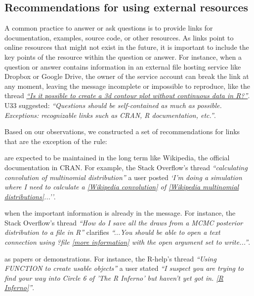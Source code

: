 \subsection{Recommendations for using external resources}

    A common practice to answer or ask questions is to provide links for documentation, examples, source code, or other resources.
    As links point to online resources that might not exist in the future, it is important to include the key points of the resource within the question or answer.
    For instance, when a question or answer contains information in an external file hosting service like Dropbox or Google Drive, the owner of the service account can break the link at any moment, leaving the message incomplete or impossible to reproduce, like the thread \textit{\href{http://goo.gl/5nanFU}{``Is it possible to create a 3d contour plot without continuous data in R?''}}.
    U33 suggested: \textit{``Questions should be self-contained as much as possible. Exceptions: recognizable links such as CRAN, R documentation, etc.''}.

    Based on our observations, we constructed a set of recommendations for links that are the exception of the rule:

    \begin{description}[itemsep=3pt, topsep=2pt, leftmargin=3em, parsep=0pt]
        \item[Well known websites] are expected to be maintained in the long term like Wikipedia, the official documentation in CRAN.
        For example, the Stack Overflow's thread \textit{``calculating convolution of multinomial distribution''} a user posted \textit{`I'm doing a simulation where I need to calculate a \href{https://en.wikipedia.org/wiki/Convolution_of_probability_distributions}{[Wikipedia convolution]} of \href{https://en.wikipedia.org/wiki/Multinomial_distribution}{[Wikipedia multinomial distributions]}...''}.

        \item[Resources that support or expand the message] when the important information is already in the message.
        For instance, the Stack Overflow's thread \textit{``How do I save all the draws from a MCMC posterior distribution to a file in R''} clarifies \textit{``...You should be able to open a text connection using ?file \href{http://stat.ethz.ch/R-manual/R-devel/library/base/html/connections.html}{[more information]} with the open argument set to write...''}.

        \item[Material relevant to the message is too big] as papers or demonstrations.
        For instance, the R-help's thread \textit{``Using FUNCTION to create usable objects''} a user stated \textit{``I suspect you are trying to find your way into Circle 6 of 'The R Inferno' but haven't yet got in. \href{http://www.burns-stat.com/pages/Tutor/R\_inferno.pdf}{[R Inferno]}''}.
    \end{description}

